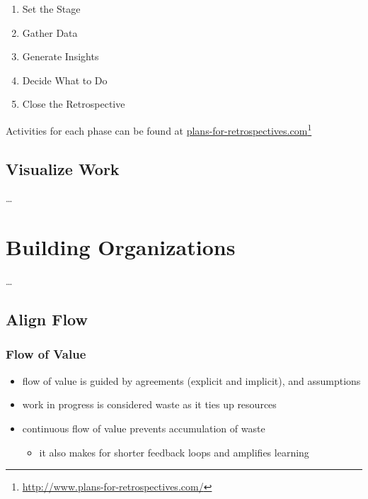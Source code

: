 \begin{enumerate}
\item Set the Stage

\item Gather Data

\item Generate Insights

\item Decide What to Do

\item Close the Retrospective

\end{enumerate}

Activities for each phase can be found at \href{http://www.plans-for-retrospectives.com/}{plans-for-retrospectives.com}\footnote{\href{http://www.plans-for-retrospectives.com/}{http:/\slash www.plans-for-retrospectives.com\slash }}

\section{Visualize Work}
\label{visualizework}

{\ldots}

\chapter{Building Organizations}
\label{buildingorganizations}

{\ldots}

\section{Align Flow}
\label{alignflow}

\subsection{Flow of Value}
\label{flowofvalue}

\begin{itemize}
\item flow of value is guided by agreements (explicit and implicit), and assumptions

\item work in progress is considered waste as it ties up resources

\item continuous flow of value prevents accumulation of waste

\begin{itemize}
\item it also makes for shorter feedback loops and amplifies learning

\end{itemize}

\end{itemize}

